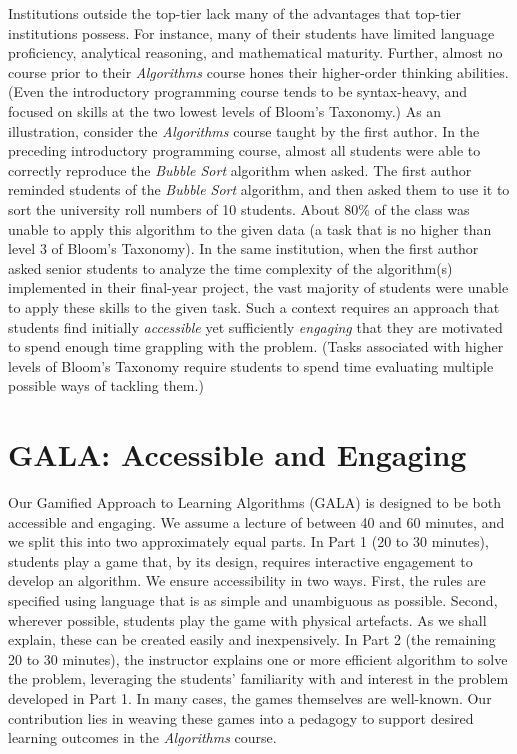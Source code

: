\begin{multicols}{2}
Institutions outside the top-tier lack many of the advantages that top-tier institutions possess. For instance, many of their students have limited language proficiency, analytical reasoning, and mathematical maturity. Further, almost no course prior to their \textit{Algorithms} course hones their higher-order thinking abilities. (Even the introductory programming course tends to be syntax-heavy, and focused on skills at the two lowest levels of Bloom’s Taxonomy.) As an illustration, consider the \textit{Algorithms} course taught by the first author. In the preceding introductory programming course, almost all students were able to correctly reproduce the \textit{Bubble Sort} algorithm when asked. The first author reminded students of the \textit{Bubble Sort} algorithm, and then asked them to use it to sort the university roll numbers of 10 students. About 80\% of the class was unable to apply this algorithm to the given data (a task that is no higher than level 3 of Bloom’s Taxonomy). In the same institution, when the first author asked senior students to analyze the time complexity of the algorithm(s) implemented in their final-year project, the vast majority of students were unable to apply these skills to the given task. Such a context requires an approach that students find initially \textit{accessible} yet sufficiently \textit{engaging} that they are motivated to spend enough time grappling with the problem. (Tasks associated with higher levels of Bloom's Taxonomy require students to spend time evaluating multiple possible ways of tackling them.)  
 
\section{GALA: Accessible and Engaging}\label{section-2}  
  
Our Gamified Approach to Learning Algorithms (GALA) is designed to be both accessible and engaging. We assume a lecture of between 40 and 60 minutes, and we split this into two approximately equal parts. In Part 1 (20 to 30 minutes), students play a game that, by its design, requires interactive engagement to develop an algorithm. We ensure accessibility in two ways. First, the rules are specified using language that is as simple and unambiguous as possible. Second, wherever possible, students play the game with physical artefacts. As we shall explain, these can be created easily and inexpensively. In Part 2 (the remaining 20 to 30 minutes), the instructor explains one or more efficient algorithm to solve the problem, leveraging the students’ familiarity with and interest in the problem developed in Part 1. In many cases, the games themselves are well-known. Our contribution lies in weaving these games into a pedagogy to support desired learning outcomes in the \textit{Algorithms} course.  
  

\end{multicols}
